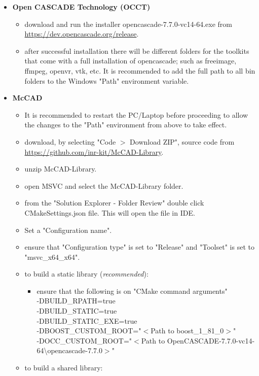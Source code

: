 \documentclass[12pt, a4paper, titlepage]{article}
\begin{document}
\begin{itemize}
      \item \textbf{Open CASCADE Technology (OCCT)}
	  \begin{itemize}
		\item download and run the installer opencascade-7.7.0-vc14-64.exe from \url{https://dev.opencascade.org/release}.
		\item after successful installation there will be different folders for the toolkits that come with a full installation of opencascade; such as freeimage, ffmpeg, openvr, vtk, etc. It is recommended to add the full path to all bin folders to the Windows "Path" environment variable.
	  \end{itemize}
	  \item \textbf{McCAD}
	  \begin{itemize}
	  	\item It is recommended to restart the PC/Laptop before proceeding to allow the changes to the "Path" environment from above to take effect. 
		\item download, by selecting "Code $>$ Download ZIP", source code from \\\url{https://github.com/inr-kit/McCAD-Library}.
		\item unzip McCAD-Library.
		\item open MSVC and select the McCAD-Library folder.
		\item from the "Solution Explorer - Folder Review" double click CMakeSettings.json file. This will open the file in IDE. \item Set a "Configuration name". 
		\item ensure that "Configuration type" is set to "Release" and "Toolset" is set to "msvc\_x64\_x64".
		\item to build a static library (\emph{recommended}):
		  \begin{itemize}
		  	\item ensure that the following is on "CMake command arguments" \\-DBUILD\_RPATH=true \\-DBUILD\_STATIC=true \\-DBUILD\_STATIC\_EXE=true \\-DBOOST\_CUSTOM\_ROOT="$<$Path to boost\_1\_81\_0$>$" \\-DOCC\_CUSTOM\_ROOT="$<$Path to OpenCASCADE-7.7.0-vc14-64\textbackslash opencascade-7.7.0$>$"
		  \end{itemize}
		\item to build a shared library:
		\begin{itemize}

\end{itemize}
\end{itemize}
\end{itemize}
\end{document}
